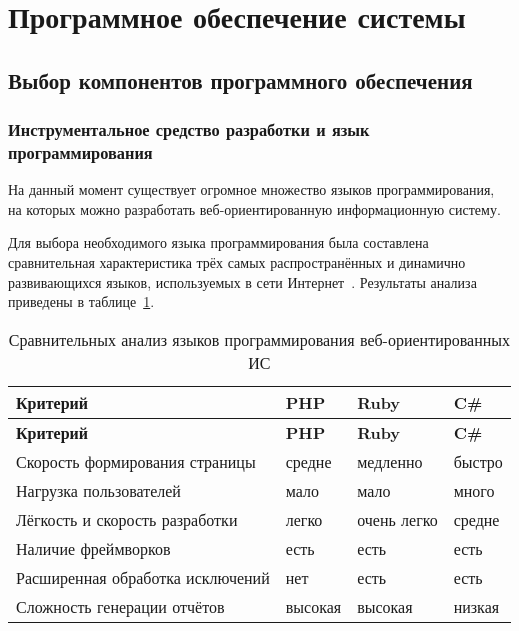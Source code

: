\section{Программное обеспечение системы}


\subsection{Выбор компонентов программного обеспечения}

\subsubsection{Инструментальное средство разработки и язык программирования}

На данный момент существует огромное множество языков программирования, на которых можно разработать веб-ориентированную информационную систему.

Для выбора необходимого языка программирования была составлена сравнительная характеристика трёх самых распространённых и динамично развивающихся языков, используемых в сети Интернет~\cite{chikagosHub,leonardTeo}.
Результаты анализа приведены в таблице~\ref{tab:software-language}.

\begin{footnotesize}
\begin{longtable}[h]{|p{}|p{}|p{}|p{}|}
	\caption{\label{tab:software-language}Сравнительных анализ языков программирования веб-ориентированных ИС} \\
	\hline
		\textbf{Критерий} &
		\textbf{PHP} &
		\textbf{Ruby} &
		\textbf{C\#} \\
	\hline \endfirsthead
	\hline
		\textbf{Критерий} &
		\textbf{PHP} &
		\textbf{Ruby} &
		\textbf{C\#} \\
	\hline \endhead
	Скорость формирования страницы & 
	средне & медленно & быстро \\ \hline
	
	Нагрузка пользователей & 
	мало & мало & много \\ \hline
	
	Лёгкость и скорость разработки & 
	легко & очень легко & средне \\ \hline
	
	Наличие фреймворков & 
	есть & есть & есть \\ \hline
	
	Расширенная обработка исключений & 
	нет	& есть & есть \\ \hline
	
	Сложность генерации отчётов & 
	высокая & высокая & низкая \\ \hline
\end{longtable}
\end{footnotesize}

